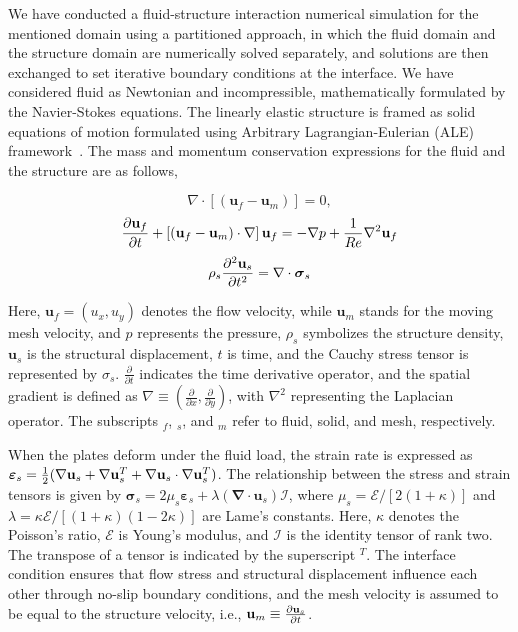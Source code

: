 \documentclass[reprint,a4paper,fleqn]{cas-dc} %
\begin{document}
		We have conducted a fluid-structure interaction numerical simulation for the mentioned domain using a partitioned approach, in which the fluid domain and the structure domain are numerically solved separately, and solutions are then exchanged to set iterative boundary conditions at the interface. We have considered fluid as Newtonian and incompressible, mathematically formulated by the Navier-Stokes equations. The linearly elastic structure is framed as solid equations of motion formulated using Arbitrary Lagrangian-Eulerian (ALE) framework~\cite{Nguyen2010, Slone2002, CampbellPaterson2011}. The mass and momentum conservation expressions for the fluid and the structure are as follows,
		\begin{center}\vspace{-0.5cm}
			\begin{equation}
				\nabla\cdot\left[(\mathbf{u}_f-\mathbf{u}_m)\right] = 0,
			\end{equation}
			\begin{equation}
				{\partial\mathbf{u}_f\over\partial t} + \left[(\mathbf{u}_f-\mathbf{u}_m) \cdot\mathbf{\nabla}\right]\mathbf{u}_f = -\nabla p+\frac{1}{Re}\nabla^2\mathbf{u}_f
			\end{equation}
			\begin{equation}
				\rho_s{\partial^2\mathbf{u}_s\over\partial t^2} = \mathbf{\nabla}\cdot\mathbf{\boldsymbol{\sigma}}_s
			\end{equation}
		\end{center}
		
		Here, $\mathbf{u}_f=(u_x,u_y)$ denotes the flow velocity, while $\mathbf{u}_m$ stands for the moving mesh velocity, and $p$ represents the pressure, $\rho_s$ symbolizes the structure density, $\mathbf{u}_s$ is the structural displacement, $t$ is time, and the Cauchy stress tensor is represented by $\sigma_s$. $\frac{\partial}{\partial t}$ indicates the time derivative operator, and the spatial gradient is defined as $\nabla\equiv\left(\frac{\partial}{\partial x},\frac{\partial}{\partial y}\right)$, with $\nabla^2$ representing the Laplacian operator.  The subscripts $_f$, $_s$, and $_m$ refer to fluid, solid, and mesh, respectively.
		
		When the plates deform under the fluid load, the strain rate is expressed as $\boldsymbol{\varepsilon}_s={1\over2}(\mathbf{\nabla}\mathbf{u}_s+\mathbf{\nabla}\mathbf{u}_s^T+\mathbf{\nabla}\mathbf{u}_s \cdot \mathbf{\nabla}\mathbf{u}_s^T)$. The relationship between the stress and strain tensors is given by $\boldsymbol{\sigma}_s=2\mu_s \boldsymbol{\varepsilon}_s+\lambda( \mathbf{\nabla}\cdot\mathbf{u}_s)\mathcal{I}$, where $\mu_s=\mathcal{E}/[2(1+\kappa)]$ and $\lambda=\kappa \mathcal{E}/[(1+\kappa)(1-2\kappa)]$ are Lame's constants. Here, $\kappa$ denotes the Poisson's ratio, $\mathcal{E}$ is Young's modulus, and $\mathcal{I}$ is the identity tensor of rank two. The transpose of a tensor is indicated by the superscript $^T$. The interface condition ensures that flow stress and structural displacement influence each other through no-slip boundary conditions, and the mesh velocity is assumed to be equal to the structure velocity, i.e., $\mathbf{u}_m\equiv {\partial\mathbf{u}_s\over\partial t}$.
		
\end{document}
